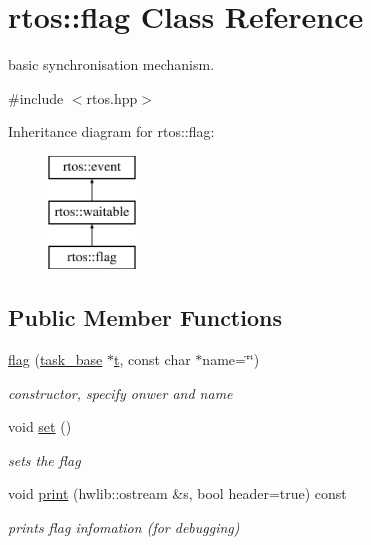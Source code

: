 \hypertarget{classrtos_1_1flag}{}\section{rtos\+:\+:flag Class Reference}
\label{classrtos_1_1flag}


basic synchronisation mechanism.  




{\ttfamily \#include $<$rtos.\+hpp$>$}

Inheritance diagram for rtos\+:\+:flag\+:\begin{figure}[H]
\begin{center}
\leavevmode
\includegraphics[height=3.000000cm]{classrtos_1_1flag}
\end{center}
\end{figure}
\subsection*{Public Member Functions}
\begin{DoxyCompactItemize}
\item 
\hyperlink{classrtos_1_1flag_af4fa671e37438103a9f12f7e0c87a6b2}{flag} (\hyperlink{classrtos_1_1task__base}{task\+\_\+base} $\ast$\hyperlink{classrtos_1_1event_aa83745aabc941145f00386fd63f6b557}{t}, const char $\ast$name=\char`\"{}\char`\"{})
\begin{DoxyCompactList}\small\item\em constructor, specify onwer and name \end{DoxyCompactList}\item 
void \hyperlink{classrtos_1_1flag_a0d2b78e288be5a3620a4f571b69f5e0a}{set} ()
\begin{DoxyCompactList}\small\item\em sets the flag \end{DoxyCompactList}\item 
void \hyperlink{classrtos_1_1flag_a49932267b755b23e8325849527330c2f}{print} (hwlib\+::ostream \&s, bool header=true) const \hypertarget{classrtos_1_1flag_a49932267b755b23e8325849527330c2f}{}\label{classrtos_1_1flag_a49932267b755b23e8325849527330c2f}

\begin{DoxyCompactList}\small\item\em prints flag infomation (for debugging) \end{DoxyCompactList}\end{DoxyCompactItemize}
